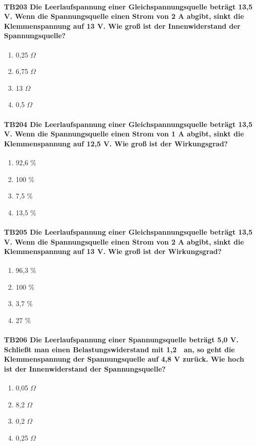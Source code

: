 \documentclass[8pt]{article}
\begin{document}
\begin{enumerate}
\paragraph*{TB203 Die Leerlaufspannung einer Gleichspannungsquelle beträgt 13,5 V. Wenn die Spannungsquelle einen Strom von 2 A abgibt, sinkt die Klemmenspannung auf 13 V. Wie groß ist der Innenwiderstand der Spannungsquelle?}
\begin{enumerate}[nolistsep,label=\Alph*]
\item 0,25 $\Omega$
\item 6,75 $\Omega$
\item 13 $\Omega$
\item 0,5 $\Omega$
\end{enumerate}



\paragraph*{TB204 Die Leerlaufspannung einer Gleichspannungsquelle beträgt 13,5 V. Wenn die Spannungsquelle einen Strom von 1 A abgibt, sinkt die Klemmenspannung auf 12,5 V. Wie groß ist der Wirkungsgrad?}
\begin{enumerate}[nolistsep,label=\Alph*]
\item 92,6 \%
\item 100 \%
\item 7,5 \%
\item 13,5 \%
\end{enumerate}



\paragraph*{TB205 Die Leerlaufspannung einer Gleichspannungsquelle beträgt 13,5 V. Wenn die Spannungsquelle einen Strom von 2 A abgibt, sinkt die Klemmenspannung auf 13 V. Wie groß ist der Wirkungsgrad?}
\begin{enumerate}[nolistsep,label=\Alph*]
\item 96,3 \%
\item 100 \%
\item 3,7 \%
\item 27 \%
\end{enumerate}



\paragraph*{TB206 Die Leerlaufspannung einer Spannungsquelle beträgt 5,0 V. Schließt man einen Belastungswiderstand mit 1,2  an, so geht die Klemmenspannung der Spannungsquelle auf 4,8 V zurück. Wie hoch ist der Innenwiderstand der Spannungsquelle?}
\begin{enumerate}[nolistsep,label=\Alph*]
\item 0,05 $\Omega$
\item 8,2 $\Omega$
\item 0,2 $\Omega$
\item 0,25 $\Omega$
\end{enumerate}




\end{enumerate}
\end{document}
